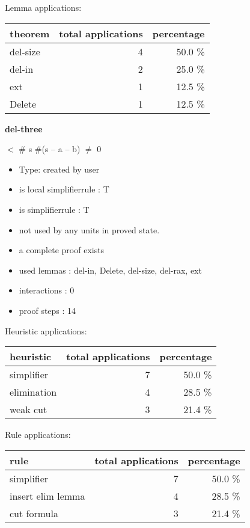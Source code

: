 \documentclass[a4paper]{article}
\begin{document}
Lemma applications:

\begin{supertabular}{l|r|r}
theorem	        & total applications & percentage \\ \hline
del-size & 4 & 50.0 \% \\
del-in & 2 & 25.0 \% \\
ext & 1 & 12.5 \% \\
Delete & 1 & 12.5 \% \\

\end{supertabular}
\pagebreak

{\LARGE\bf del-three}\label{lemma-del-three}

\medskip

  $<$ \# s \Imp \#(s -- a -- b) $\neq$ 0

\begin{itemize}

\item Type: created by user

\item is local simplifierrule : T
\item is simplifierrule : T
\item not used by any units in proved state.
\item       a complete proof exists
\item       used lemmas  : del-in, Delete, del-size, del-rax, ext
\item       interactions : 0
\item       proof steps  : 14
\end{itemize}

\medskip


Heuristic applications:

\begin{supertabular}{l|r|r}
heuristic	& total applications & percentage \\ \hline
simplifier & 7 & 50.0 \% \\
elimination & 4 & 28.5 \% \\
weak cut & 3 & 21.4 \% \\

\end{supertabular}

Rule applications:

\begin{supertabular}{l|r|r}
rule	        & total applications & percentage \\ \hline
simplifier & 7 & 50.0 \% \\
insert elim lemma & 4 & 28.5 \% \\
cut formula & 3 & 21.4 \% \\

\end{supertabular}
\end{document}
